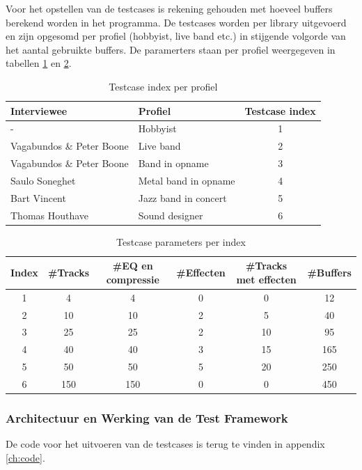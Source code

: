Voor het opstellen van de testcases is rekening gehouden met hoeveel buffers berekend worden in het programma. De testcases worden per library uitgevoerd en zijn opgesomd per profiel (hobbyist, live band etc.) in stijgende volgorde van het aantal gebruikte buffers. De paramerters staan per profiel weergegeven in tabellen \ref{tab:profielen} en \ref{tab:parameters}.

\begin{table}[]
\begin{tabular}{ll|c}
\textbf{Interviewee} & \textbf{Profiel} & \textbf{Testcase index} \\ \hline
- & Hobbyist & 1 \\
Vagabundos \& Peter Boone & Live band & 2 \\
Vagabundos \& Peter Boone & Band in opname & 3 \\
Saulo Soneghet & Metal band in opname & 4 \\
Bart Vincent & Jazz band in concert & 5 \\
Thomas Houthave & Sound designer & 6 \\ \hline
\end{tabular}
\caption{Testcase index per profiel}
\label{tab:profielen}
\end{table}

\begin{table}[]
\begin{tabular}{c|cccc|c}
\textbf{Index} & \textbf{\#Tracks} & \textbf{\#EQ en compressie} & \textbf{\#Effecten} & \textbf{\#Tracks met effecten} & \textbf{\#Buffers} \\ \hline
1 & 4 & 4 & 0 & 0 & 12 \\
2 & 10 & 10 & 2 & 5 & 40 \\
3 & 25 & 25 & 2 & 10 & 95 \\
4 & 40 & 40 & 3 & 15 & 165 \\
5 & 50 & 50 & 5 & 20 & 250 \\
6 & 150 & 150 & 0 & 0 & 450 
\end{tabular}
\caption{Testcase parameters per index}
\label{tab:parameters}
\end{table}

\subsubsection{Architectuur en Werking van de Test Framework}
\label{subsub:testframework}

De code voor het uitvoeren van de testcases is terug te vinden in appendix \ref{ch:code}.

